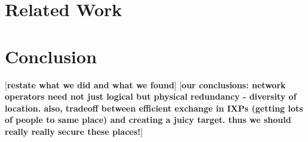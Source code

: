 \documentclass{sig-alternate-10pt}
\newcommand{\tbd}[1]{[{\bf{#1}}]}
\begin{document}
    \section{Related Work}
    

    \section{Conclusion}
        \tbd{restate what we did and what we found}
    \tbd{our conclusions: network operators need not just logical but
    physical redundancy - diversity of location. also, tradeoff between
    efficient exchange in IXPs (getting lots of people to same place) and
    creating a juicy target. thus we should really really secure these
    places!}



%
\end{document}
